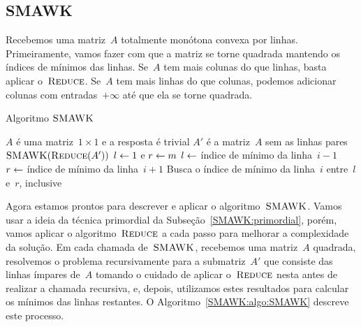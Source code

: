 
\subsection{SMAWK}
\newcommand{\SMAWK}{\textsc{SMAWK}}

Recebemos uma matriz~$A$ totalmente monótona convexa por linhas. Primeiramente, vamos fazer com que a matriz se torne quadrada mantendo os índices de mínimos das linhas. Se~$A$ tem mais colunas do que linhas, basta aplicar o~$\textsc{Reduce}$. Se~$A$ tem mais linhas do que colunas, podemos adicionar colunas com entradas~${ +\infty }$ até que ela se torne quadrada.

\begin{algorithm}[h]
\caption{Algoritmo $\SMAWK$}
\label{SMAWK:algo:SMAWK}
\begin{algorithmic}[1]
\Function{\SMAWK}{A}
        \State $A$ é uma matriz~$1 \times 1$ e a resposta é trivial
    \Else
        \State $A'$ é a matriz~$A$ sem as linhas pares
        \State $\SMAWK(\Reduce(A'))$
            \State $l \leftarrow 1$ e $r \leftarrow m$
                \State $l \leftarrow$ índice de mínimo da linha~$i - 1$
            \EndIf
                \State $r \leftarrow$ índice de mínimo da linha~$i + 1$
            \EndIf
            \State Busca o índice de mínimo da linha~$i$ entre~$l$ e~$r$, inclusive
        \EndFor
    \EndIf
\EndFunction
\end{algorithmic}
\end{algorithm}

Agora estamos prontos para descrever e aplicar o algoritmo~$\SMAWK$. Vamos usar a ideia da técnica primordial da Subseção~\ref{SMAWK:primordial}, porém, vamos aplicar o algoritmo~$\textsc{Reduce}$ a cada passo para melhorar a complexidade da solução. Em cada chamada de~$\SMAWK$, recebemos uma matriz~$A$ quadrada, resolvemos o problema recursivamente para a submatriz~$A'$ que consiste das linhas ímpares de~$A$ tomando o cuidado de aplicar o~$\textsc{Reduce}$ nesta antes de realizar a chamada recursiva, e, depois, utilizamos estes resultados para calcular os mínimos das linhas restantes. O Algoritmo~\ref{SMAWK:algo:SMAWK} descreve este processo.


